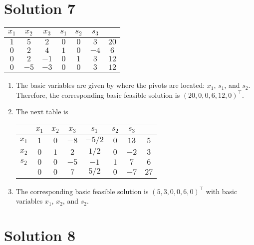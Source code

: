 \documentclass[a4paper, 12pt]{article}
\numberwithin{equation}{section}
\numberwithin{figure}{section}
\theoremstyle{definition}
\begin{document}
\section*{Solution 7}

\begin{center}
    \begin{tabular}{|cccccc|c|}
        \hline 
        $x_1$ & $x_2$ & $x_3$ & $s_1$ & $s_2$ & $s_3$ & \\ \hline
        $1$ & $5$ & $2$ & $0$ & $0$ & $3$ & $20$ \\
        $0$ & $2$ & $4$ & $1$ & $0$ & $-4$ & $6$ \\
        $0$ & $2$ & $-1$ & $0$ & $1$ & $3$ & $12$ \\ \hline 
        $0$ & $-5$ & $-3$ & $0$ & $0$ & $3$ & $12$ \\ \hline
    \end{tabular}
\end{center}
\begin{enumerate}[label=$(\roman*)$]
    \item The basic variables are given by where the pivots are located: $x_1$,
    $s_1$, and $s_2$. Therefore, the corresponding basic feasible solution is
    $(20, 0, 0, 6, 12,0)^{\top}$.
    \item The next table is
    \begin{center}
        \begin{tabular}{|c|cccccc|c|}
            \hline 
            & $x_1$ & $x_2$ & $x_3$ & $s_1$ & $s_2$ & $s_3$ & \\ \hline
            $x_1$ & $1$ & $0$ & $-8$ & $-5/2$ & $0$ & $13$ & $5$ \\
            $x_2$ & $0$ & $1$ & $2$ & $1/2$ & $0$ & $-2$ & $3$ \\
            $s_2$ & $0$ & $0$ & $-5$ & $-1$ & $1$ & $7$ & $6$ \\ \hline 
            & $0$ & $0$ & $7$ & $5/2$ & $0$ & $-7$ & $27$ \\ \hline
        \end{tabular}
    \end{center}
    \item The corresponding basic feasible solution is $(5, 3, 0, 0, 6,
    0)^{\top}$ with basic variables $x_1$, $x_2$, and $s_2$.
\end{enumerate}

\section*{Solution 8}
\end{document}
